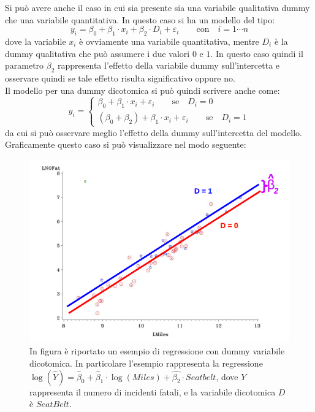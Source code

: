 Si può avere anche il caso in cui sia presente sia una variabile qualitativa dummy che una variabile quantitativa. In questo caso si ha un modello del tipo:
\begin{equation}
	y_i = \beta_0 + \beta_1 \cdot x_i + \beta_2 \cdot D_i + \varepsilon_i \qquad \text{con} \quad i=1 \cdots n
	\label{eq: regressione dummy+quantitativa}
\end{equation}
dove la variabile $x_i$ è ovviamente una variabile quantitativa, mentre $D_i$ è la dummy qualitativa che può assumere i due valori $0$ e $1$. In questo caso quindi il parametro $\beta_2$ rappresenta l'effetto della variabile dummy sull'intercetta e osservare quindi se tale effetto risulta significativo oppure no.\\
Il modello per una dummy dicotomica si può quindi scrivere anche come:
\begin{equation}
y_i = 
\begin{cases}
\beta_0 + \beta_1 \cdot x_i + \varepsilon_i \qquad \text{se} \quad D_i = 0 \\
(\beta_0 + \beta_2) + \beta_1 \cdot x_i  + \varepsilon_i \qquad \text{se} \quad D_i = 1
\end{cases}
\end{equation}
da cui si può osservare meglio l'effetto della dummy sull'intercetta del modello.\\
Graficamente questo caso si può visualizzare nel modo seguente:
\begin{figure}
	\centering
	\includegraphics[scale = 0.5]{Immagini/regressione-dummy.png}
	\caption{In figura è riportato un esempio di regressione con dummy variabile dicotomica. In particolare l'esempio rappresenta la regressione $\log(\hat{Y}) = \hat{\beta}_0 + \hat{\beta}_1 \cdot \log(Miles) + \hat{\beta_2} \cdot Seatbelt$, dove $Y$ rappresenta il numero di incidenti fatali, e la variabile dicotomica $D$ è $SeatBelt$.}
\end{figure}